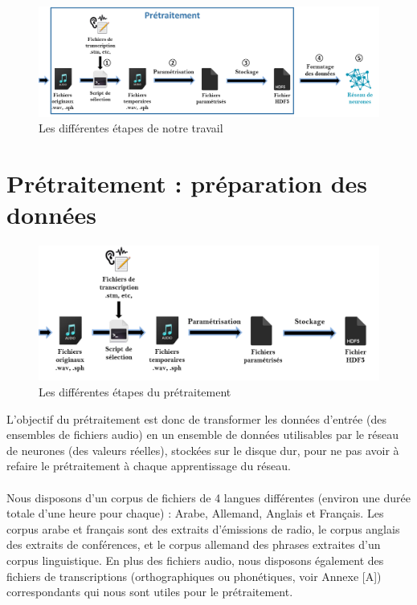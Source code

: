 \documentclass{article}
\begin{document}
\begin{figure}[h]
  \centerline{\includegraphics[scale=0.7]{img/schema_complet.png}}
  \caption{Les différentes étapes de notre travail}
\end{figure}

\newpage
\section{Prétraitement : préparation des données}
\hphantom{.}
\begin{figure}[h]
  \centerline{\includegraphics[scale=0.8]{img/schema_pretraitement.png}}
  \caption{Les différentes étapes du prétraitement}
\end{figure}

L'objectif du prétraitement est donc de transformer les données d'entrée (des ensembles de fichiers audio) en un ensemble de données utilisables par le réseau de neurones (des valeurs réelles), stockées sur le disque dur, pour ne pas avoir à refaire le prétraitement à chaque apprentissage du réseau.\\
 \\
 Nous disposons d'un corpus de fichiers de 4 langues différentes (environ une durée totale d'une heure pour chaque) : Arabe, Allemand, Anglais et Français. Les corpus arabe et français sont des extraits d'émissions de radio, le corpus anglais des extraits de conférences, et le corpus allemand des phrases extraites d'un corpus linguistique. En plus des fichiers audio, nous disposons également des fichiers de transcriptions (orthographiques ou phonétiques, voir Annexe [A]) correspondants qui nous sont utiles pour le prétraitement.
\end{document}
